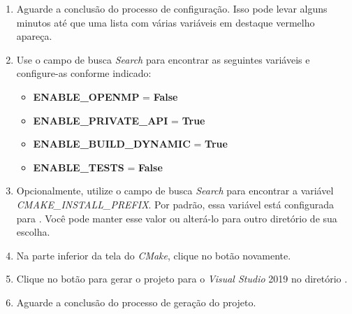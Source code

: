 \documentclass[a4paper,11pt]{article}
\newcommand{\cmake}{\textit{CMake}}
\newcommand{\visualstudio}{\textit{Visual Studio}}
\newcommand{\gmsh}{\textit{Gmsh}}
\begin{document}
\begin{enumerate}
\begin{enumerate}
		\begin{figure}[H]\centering
			\caption{Definição do gerador de projeto e plataforma no \cmake{}}\label{fig:gmshbuildconfigure}
		\end{figure}
		
		\item Aguarde a conclusão do processo de configuração. Isso pode levar alguns minutos até que uma lista com várias variáveis em destaque vermelho apareça.
		\item Use o campo de busca \emph{Search} para encontrar as seguintes variáveis e configure-as conforme indicado:
		\begin{itemize}
			\item \textbf{ENABLE\_OPENMP} = \textbf{False}
			\item \textbf{ENABLE\_PRIVATE\_API} = \textbf{True}
			\item \textbf{ENABLE\_BUILD\_DYNAMIC} = \textbf{True}
			\item \textbf{ENABLE\_TESTS} = \textbf{False}
		\end{itemize}
		\item Opcionalmente, utilize o campo de busca \emph{Search} para encontrar a variável \emph{CMAKE\_INSTALL\_PREFIX}. Por padrão, essa variável está configurada para \path{C:/Program Files/\gmsh{}}. Você pode manter esse valor ou alterá-lo para outro diretório de sua escolha.
		\item Na parte inferior da tela do \cmake{}, clique no botão  novamente.
		\item Clique no botão  para gerar o projeto para o \visualstudio{} 2019 no diretório .
		\item Aguarde a conclusão do processo de geração do projeto.
	\end{enumerate}
	

\end{enumerate}
\end{document}
